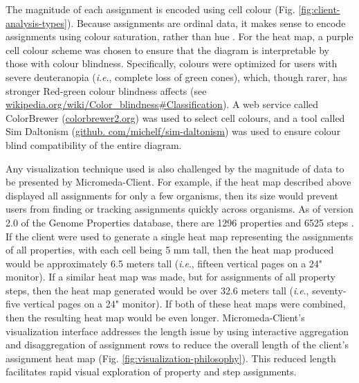 The magnitude of each assignment is encoded using cell colour (Fig. 
\ref{fig:client-analysis-types}). Because assignments are ordinal data, it makes 
sense to encode assignments using colour saturation, rather than hue 
\cite{munzner2015visualization}. For the heat map, a purple cell colour scheme 
was chosen to ensure that the diagram is interpretable by those with colour 
blindness. Specifically, colours were optimized for users with severe 
deuteranopia (\textit{i}.\textit{e}., complete loss of green cones), which, though rarer, has 
stronger Red-green colour blindness affects (see 
\href{http://wikipedia.org/wiki/Color_blindness#Classification}{wikipedia.org/wiki/Color\_blindness\#Classification}). 
A web service called ColorBrewer 
(\href{http://colorbrewer2.org}{colorbrewer2.org}) was used to select cell 
colours, and a tool called Sim Daltonism 
(\href{http://github.com/michelf/sim-daltonism}{github. 
com/michelf/sim-daltonism}) was used to ensure colour blind compatibility of the 
entire diagram. 

Any visualization technique used is also challenged by the magnitude of data to 
be presented by Micromeda-Client. For example, if the heat map described above 
displayed all assignments for only a few organisms, then its size would prevent 
users from finding or tracking assignments quickly across organisms. As of 
version 2.0 of the Genome Properties database, there are 1296 properties and 
6525 steps \cite{richardson2018genome}. If the client were used to generate a 
single heat map representing the assignments of all properties, with each cell 
being 5 mm tall, then the heat map produced would be approximately 6.5 meters 
tall (\textit{i}.\textit{e}., fifteen vertical pages on a 24" monitor). If a similar heat map was 
made, but for assignments of all property steps, then the heat map generated 
would be over 32.6 meters tall (\textit{i}.\textit{e}., seventy-five vertical pages on a 24" 
monitor). If both of these heat maps were combined, then the resulting heat map 
would be even longer. Micromeda-Client's visualization interface addresses the 
length issue by using interactive aggregation and disaggregation 
\cite{munzner2015visualization} of assignment rows to reduce the overall length 
of the client's assignment heat map (Fig. \ref{fig:visualization-philosophy}). This 
reduced length facilitates rapid visual exploration of property and step 
assignments.

